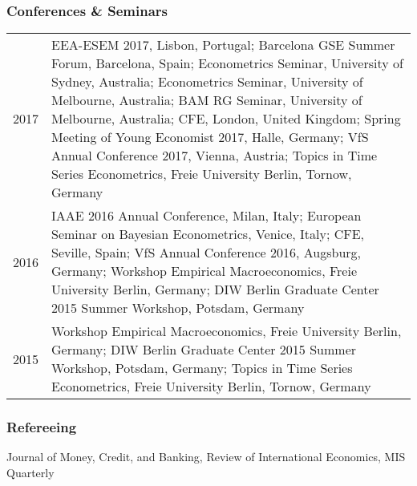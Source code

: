 \documentclass[10pt,a4paper]{article}
\begin{document}
\subsubsection*{Conferences \& Seminars}
\begin{tabular}{ p{3cm} | p{12cm}}
	2017 &  EEA-ESEM 2017, Lisbon, Portugal;  Barcelona GSE Summer Forum, Barcelona, Spain; Econometrics Seminar, University of Sydney, Australia; Econometrics Seminar, University of Melbourne, Australia;  BAM RG Seminar, University of Melbourne, Australia; CFE, London, United Kingdom; Spring Meeting of Young Economist 2017, Halle, Germany; VfS Annual Conference 2017, Vienna, Austria; Topics in Time Series Econometrics, Freie University Berlin, Tornow, Germany  \\[0.1cm]
	2016 & IAAE 2016 Annual Conference, Milan, Italy;  European Seminar on Bayesian Econometrics, Venice, Italy; CFE, Seville, Spain; VfS Annual Conference 2016, Augsburg, Germany; 
	Workshop Empirical Macroeconomics, Freie University Berlin, Germany;  DIW Berlin Graduate Center 2015 Summer Workshop, Potsdam, Germany \\ [0.1cm]
	2015 & Workshop Empirical Macroeconomics, Freie University Berlin, Germany; DIW Berlin Graduate Center 2015 Summer Workshop, Potsdam, Germany; Topics in Time Series Econometrics, Freie University Berlin, Tornow, Germany
\end{tabular}
\vspace{0.2cm}
\subsubsection*{Refereeing} 
Journal of Money, Credit, and Banking, Review of International Economics, MIS Quarterly
\vspace{0.2cm}
\end{document}

